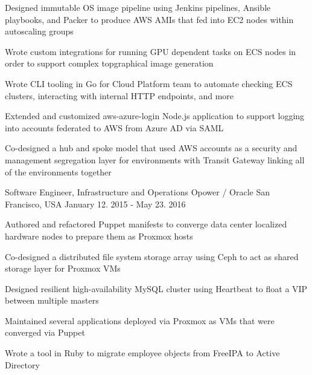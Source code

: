 \begin{cventries}
{\begin{cvitems}
        \item {Designed immutable OS image pipeline using Jenkins pipelines, Ansible playbooks, and Packer to produce AWS AMIs that fed into EC2 nodes within autoscaling groups}
        \item {Wrote custom integrations for running GPU dependent tasks on ECS nodes in order to support complex topgraphical image generation}
        \item {Wrote CLI tooling in Go for Cloud Platform team to automate checking ECS clusters, interacting with internal HTTP endpoints, and more}
        \item {Extended and customized aws-azure-login Node.js application to support logging into accounts federated to AWS from Azure AD via SAML}
        \item {Co-designed a hub and spoke model that used AWS accounts as a security and management segregation layer for environments with Transit Gateway linking all of the environments together}
      \end{cvitems}
    }

  \cventry
    {Software Engineer, Infrastructure and Operations} %
    {Opower / Oracle} %
    {San Francisco, USA} %
    {January 12. 2015 - May 23. 2016} %
    {
      \begin{cvitems} %
        \item {Authored and refactored Puppet manifests to converge data center localized hardware nodes to prepare them as Proxmox hosts}
        \item {Co-designed a distributed file system storage array using Ceph to act as shared storage layer for Proxmox VMs}
        \item {Designed resilient high-availability MySQL cluster using Heartbeat to float a VIP between multiple masters}
        \item {Maintained several applications deployed via Proxmox as VMs that were converged via Puppet}
        \item {Wrote a tool in Ruby to migrate employee objects from FreeIPA to Active Directory}
      \end{cvitems}
    }


\end{cventries}
